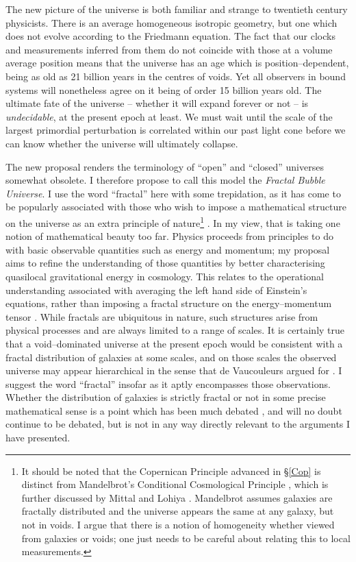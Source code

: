 \documentclass[12pt]{iopart}
\begin{document}
The new picture of the universe is both familiar and strange to twentieth
century physicists. There is an average homogeneous isotropic geometry, but
one which does not evolve according to the Friedmann equation. The fact that
our clocks and measurements inferred from them do not coincide with those
at a volume average position means that the universe has an age which is
position--dependent, being as old as 21 billion years in the centres of voids.
Yet all observers in bound systems will nonetheless agree on it being of
order 15 billion years old. The ultimate fate of the universe -- whether it
will expand forever or not -- is {\em undecidable}, at the present epoch
at least. We must wait until the scale of the largest primordial
perturbation is correlated within our past light cone before we can know
whether the universe will ultimately collapse.

The new proposal renders the terminology of ``open'' and ``closed''
universes somewhat obsolete. I therefore propose to call this model
the {\em Fractal Bubble Universe}. I use the word ``fractal'' here
with some trepidation, as it has come to be popularly associated with
those who wish to impose a mathematical structure on the universe as an
extra principle of nature\footnote{It should be noted that the Copernican
Principle advanced in \S\ref{Cop} is distinct from Mandelbrot's Conditional
Cosmological Principle \cite{Mandel}, which is further discussed by Mittal
and Lohiya \cite{ML}. Mandelbrot assumes galaxies are fractally distributed
and the universe appears the same at any galaxy, but not in voids. I argue
that there is a notion of homogeneity whether viewed from galaxies or voids;
one just needs to be careful about relating this to local measurements.}
\cite{Mandel}. In my view, that is taking one
notion of mathematical beauty too far. Physics proceeds from principles to
do with basic observable quantities such as energy and momentum; my proposal
aims to refine the understanding of those quantities by better characterising
quasilocal gravitational energy in cosmology. This relates to the operational
understanding associated with averaging the left hand side of Einstein's
equations, rather than imposing a fractal structure on the energy--momentum
tensor \cite{ML}. While fractals are
ubiquitous in nature, such structures arise from physical processes and
are always limited to a range of scales.
It is certainly true that a void--dominated universe at the present epoch
would be consistent with a fractal distribution of galaxies at some scales,
and on those scales the observed universe may appear hierarchical in the sense
that de Vaucouleurs argued for \cite{deVau}. I suggest the word ``fractal''
insofar as it aptly encompasses those observations. Whether the distribution
of galaxies is strictly fractal or not in some precise mathematical sense
is a point which has been much debated \cite{paradox1,fractals}, and will
no doubt continue to be debated, but is not in any way directly relevant to the
arguments I have presented.
\end{document}
